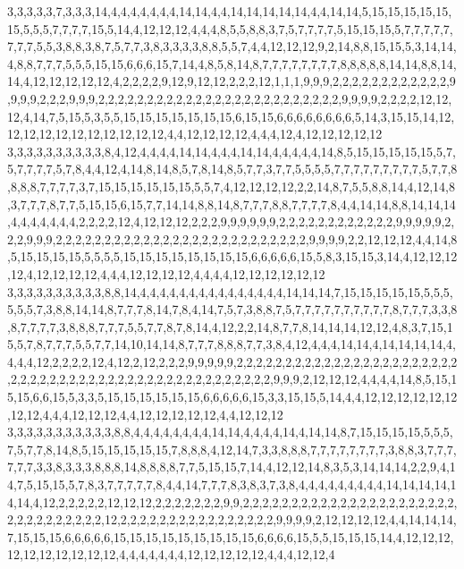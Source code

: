 3,3,3,3,3,7,3,3,3,14,4,4,4,4,4,4,4,14,14,4,4,14,14,14,14,14,4,4,14,14,5,15,15,15,15,15,15,5,5,5,7,7,7,7,15,5,14,4,12,12,12,4,4,4,8,5,5,8,8,3,7,5,7,7,7,7,5,15,15,15,5,7,7,7,7,7,7,7,7,5,5,3,8,8,3,8,7,5,7,7,3,8,3,3,3,3,8,8,5,5,7,4,4,12,12,12,9,2,14,8,8,15,15,5,3,14,14,4,8,8,7,7,7,5,5,5,15,15,6,6,6,15,7,14,4,8,5,8,14,8,7,7,7,7,7,7,7,7,8,8,8,8,8,14,14,8,8,14,14,4,12,12,12,12,12,4,2,2,2,2,9,12,9,12,12,2,2,2,12,1,1,1,9,9,9,2,2,2,2,2,2,2,2,2,2,2,2,9,9,9,9,2,2,2,9,9,9,2,2,2,2,2,2,2,2,2,2,2,2,2,2,2,2,2,2,2,2,2,2,2,2,2,9,9,9,9,2,2,2,2,12,12,12,4,14,7,5,15,5,3,5,5,15,15,15,15,15,15,15,6,15,15,6,6,6,6,6,6,6,6,5,14,3,15,15,14,12,12,12,12,12,12,12,12,12,12,12,4,4,12,12,12,12,4,4,4,12,4,12,12,12,12,12
3,3,3,3,3,3,3,3,3,3,8,4,12,4,4,4,4,14,14,4,4,4,14,14,4,4,4,4,4,14,8,5,15,15,15,15,15,5,7,5,7,7,7,7,5,7,8,4,4,12,4,14,8,14,8,5,7,8,14,8,5,7,7,3,7,7,5,5,5,5,7,7,7,7,7,7,7,7,7,5,7,7,8,8,8,8,7,7,7,7,3,7,15,15,15,15,15,15,5,5,7,4,12,12,12,12,2,2,14,8,7,5,5,8,8,14,4,12,14,8,3,7,7,7,8,7,7,5,15,15,6,15,7,7,14,14,8,8,14,8,7,7,7,8,8,7,7,7,7,8,4,4,14,14,8,8,14,14,14,4,4,4,4,4,4,4,2,2,2,2,12,4,12,12,12,2,2,2,9,9,9,9,9,9,2,2,2,2,2,2,2,2,2,2,2,2,9,9,9,9,9,2,2,2,9,9,9,2,2,2,2,2,2,2,2,2,2,2,2,2,2,2,2,2,2,2,2,2,2,2,2,2,2,9,9,9,9,2,2,12,12,12,4,4,14,8,5,15,15,15,15,5,5,5,5,15,15,15,15,15,15,15,15,6,6,6,6,6,15,5,8,3,15,15,3,14,4,12,12,12,12,4,12,12,12,12,4,4,4,12,12,12,12,4,4,4,4,12,12,12,12,12,12
3,3,3,3,3,3,3,3,3,3,8,8,14,4,4,4,4,4,4,4,4,4,4,4,4,4,4,4,14,14,14,7,15,15,15,15,15,5,5,5,5,5,5,7,3,8,8,14,14,8,7,7,7,8,14,7,8,4,14,7,5,7,3,8,8,7,5,7,7,7,7,7,7,7,7,7,7,8,7,7,7,3,3,8,8,7,7,7,7,3,8,8,8,7,7,7,5,5,7,7,8,7,8,14,4,12,2,2,14,8,7,7,8,14,14,14,12,12,4,8,3,7,15,15,5,7,8,7,7,7,5,5,7,7,14,10,14,14,8,7,7,7,8,8,8,7,7,3,8,4,12,4,4,4,14,14,4,14,14,14,14,4,4,4,4,12,2,2,2,2,12,4,12,2,12,2,2,2,9,9,9,9,9,2,2,2,2,2,2,2,2,2,2,2,2,2,2,2,2,2,2,2,2,2,2,2,2,2,2,2,2,2,2,2,2,2,2,2,2,2,2,2,2,2,2,2,2,2,2,2,2,2,2,9,9,9,2,12,12,12,4,4,4,4,14,8,5,15,15,15,6,6,15,5,3,3,5,15,15,15,15,15,15,6,6,6,6,6,15,3,3,15,15,5,14,4,4,12,12,12,12,12,12,12,12,4,4,4,12,12,12,4,4,12,12,12,12,12,4,4,12,12,12
3,3,3,3,3,3,3,3,3,3,3,8,8,4,4,4,4,4,4,4,4,14,14,4,4,4,4,14,4,14,14,8,7,15,15,15,15,5,5,5,7,5,7,7,8,14,8,5,15,15,15,15,15,7,8,8,8,4,12,14,7,3,3,8,8,8,7,7,7,7,7,7,7,7,3,8,8,3,7,7,7,7,7,7,3,3,8,3,3,3,8,8,8,14,8,8,8,8,7,7,5,15,15,7,14,4,12,12,14,8,3,5,3,14,14,14,2,2,9,4,14,7,5,15,15,5,7,8,3,7,7,7,7,7,8,4,4,14,7,7,7,8,3,8,3,7,3,8,4,4,4,4,4,4,4,4,4,14,14,14,14,14,14,4,12,2,2,2,2,2,12,12,12,2,2,2,2,2,2,2,9,9,2,2,2,2,2,2,2,2,2,2,2,2,2,2,2,2,2,2,2,2,2,2,2,2,2,2,2,2,2,2,2,2,12,2,2,2,2,2,2,2,2,2,2,2,2,2,2,2,2,9,9,9,9,2,12,12,12,12,4,4,14,14,14,7,15,15,15,6,6,6,6,6,15,15,15,15,15,15,15,15,15,6,6,6,6,15,5,5,15,15,15,14,4,12,12,12,12,12,12,12,12,12,12,4,4,4,4,4,4,4,12,12,12,12,12,4,4,4,12,12,4
